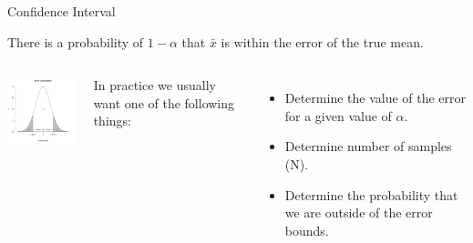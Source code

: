 \begin{frame}{Confidence Interval}

  There is a probability of $1-\alpha$ that $\bar{x}$ is within the
  error of the true mean.

  \begin{columns}

    \centerline{\includegraphics[width=4cm]{img/confidenceInterval}}


    In practice we usually want one of the following things:
    \begin{itemize}
    \item Determine the value of the error for a given value of $\alpha$.
    \item Determine number of samples (N).
    \item Determine the probability that we are outside of the error bounds.
    \end{itemize}

  \end{columns}
  
\end{frame}


